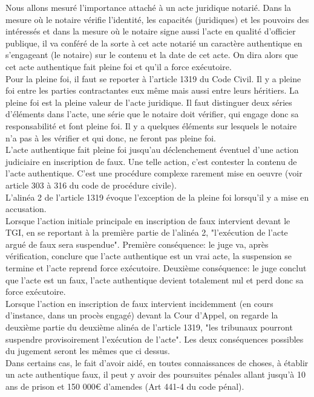 Nous allons mesuré l'importance attaché à un acte juridique notarié. Dans la mesure où le notaire vérifie l'identité, les capacités (juridiques) et les pouvoirs des intéressés et dans la mesure où le notaire signe aussi l'acte en qualité d'officier publique, il va conféré de la sorte à cet acte notarié un caractère authentique en s'engageant (le notaire) sur le contenu et la date de cet acte. On dira alors que cet acte authentique fait pleine foi et qu'il a force exécutoire. \\
Pour la pleine foi, il faut se reporter à l'article 1319 du Code Civil. Il y a pleine foi entre les parties contractantes eux même mais aussi entre leurs héritiers. La pleine foi est la pleine valeur de l'acte juridique. Il faut distinguer deux séries d'éléments dans l'acte, une série que le notaire doit vérifier, qui engage donc sa responsabilité et font pleine foi. Il y a quelques éléments sur lesquels le notaire n'a pas à les vérifier et qui donc, ne feront pas pleine foi. \\
L'acte authentique fait pleine foi jusqu'au déclenchement éventuel d'une action judiciaire en inscription de faux. Une telle action, c'est contester la contenu de l'acte authentique. C'est une procédure complexe rarement mise en oeuvre (voir article 303 à 316 du code de procédure civile). \\
L'alinéa 2 de l'article 1319 évoque l'exception de la pleine foi lorsqu'il y a mise en accusation. \\
Lorsque l'action initiale principale en inscription de faux intervient devant le TGI, en se reportant à la première partie de l'alinéa 2, "l'exécution de l'acte argué de faux sera suspendue". Première conséquence: le juge va, après vérification, conclure que l'acte authentique est un vrai acte, la suspension se termine et l'acte reprend force exécutoire. Deuxième conséquence: le juge conclut que l'acte est un faux, l'acte authentique devient totalement nul et perd donc sa force exécutoire. \\
Lorsque l'action en inscription de faux intervient incidemment (en cours d'instance, dans un procès engagé) devant la Cour d'Appel, on regarde la deuxième partie du deuxième alinéa de l'article 1319, "les tribunaux pourront suspendre provisoirement l'exécution de l'acte". Les deux conséquences possibles du jugement seront les mêmes que ci dessus. \\
Dans certains cas, le fait d'avoir aidé, en toutes connaissances de choses, à établir un acte authentique faux, il peut y avoir des poursuites pénales allant jusqu'à 10 ans de prison et 150 000€ d'amendes (Art 441-4 du code pénal). 


